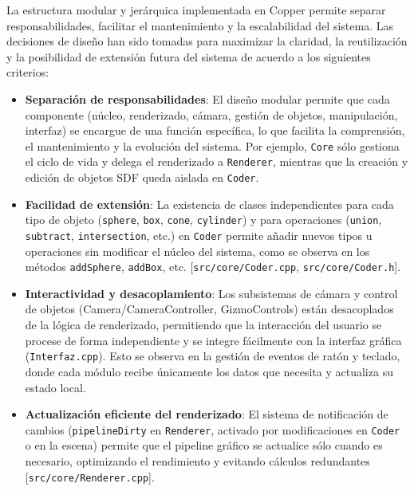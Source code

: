 La estructura modular y jerárquica implementada en Copper permite separar
responsabilidades, facilitar el mantenimiento y la escalabilidad del sistema.
Las decisiones de diseño han sido tomadas para maximizar la claridad, la
reutilización y la posibilidad de extensión futura del sistema de acuerdo a los
siguientes criterios:

\begin{itemize}
    \item \textbf{Separación de responsabilidades}: El diseño modular permite que cada componente (núcleo, renderizado, cámara, gestión de objetos, manipulación, interfaz) se encargue de una función específica, lo que facilita la comprensión, el mantenimiento y la evolución del sistema. Por ejemplo, \texttt{Core} sólo gestiona el ciclo de vida y delega el renderizado a \texttt{Renderer}, mientras que la creación y edición de objetos SDF queda aislada en \texttt{Coder}.
    \item \textbf{Facilidad de extensión}: La existencia de clases independientes para cada tipo de objeto (\texttt{sphere}, \texttt{box}, \texttt{cone}, \texttt{cylinder}) y para operaciones (\texttt{union}, \texttt{subtract}, \texttt{intersection}, etc.) en \texttt{Coder} permite añadir nuevos tipos u operaciones sin modificar el núcleo del sistema, como se observa en los métodos \texttt{addSphere}, \texttt{addBox}, etc. [\texttt{src/core/Coder.cpp}, \texttt{src/core/Coder.h}].
    \item \textbf{Interactividad y desacoplamiento}: Los subsistemas de cámara y control de objetos (Camera/CameraController, GizmoControls) están desacoplados de la lógica de renderizado, permitiendo que la interacción del usuario se procese de forma independiente y se integre fácilmente con la interfaz gráfica (\texttt{Interfaz.cpp}). Esto se observa en la gestión de eventos de ratón y teclado, donde cada módulo recibe únicamente los datos que necesita y actualiza su estado local.
    \item \textbf{Actualización eficiente del renderizado}: El sistema de notificación de cambios (\texttt{pipelineDirty} en \texttt{Renderer}, activado por modificaciones en \texttt{Coder} o en la escena) permite que el pipeline gráfico se actualice sólo cuando es necesario, optimizando el rendimiento y evitando cálculos redundantes [\texttt{src/core/Renderer.cpp}].
\end{itemize}